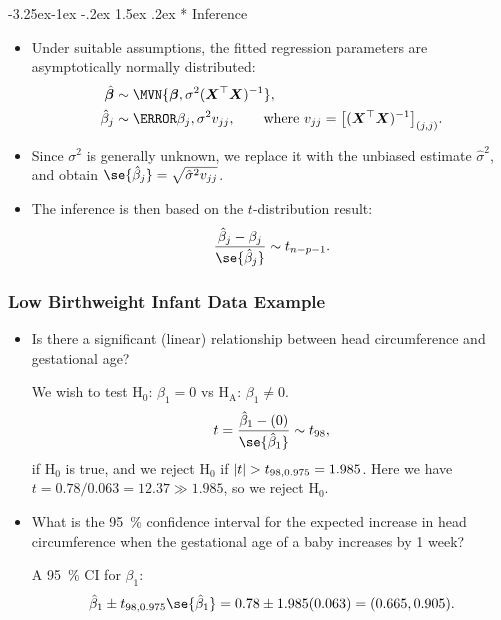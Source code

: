 \documentclass[final]{article}\usepackage[]{graphicx}\usepackage[svgnames]{xcolor}
\makeatletter
\newcommand*\circled[1]{\tikz[baseline=(char.base)]{\node[shape=circle,draw,inner sep=2pt] (char) {#1};}}
\renewcommand\subsection{\@startsection{subsection}{2}{\z@}%
                                     {-3.25ex\@plus -1ex \@minus -.2ex}%
                                     {1.5ex \@plus .2ex}%
                                     {\normalfont\large\bfseries\scshape\color{Blue}}}
\newcommand{\HN}{\text{H}_0}%
\newcommand{\HA}{\text{H}_{\text{A}}}%
\DeclarePairedDelimiter\abs{\lvert}{\rvert}
\providecommand{\Vector}[1]{\bm{#1}}%
\providecommand{\Matrix}[1]{\bm{#1}}
\makeatother
\begin{document}
\subsection*{\circled{4} Inference}
\begin{itemize}
    \item Under suitable assumptions, the fitted regression parameters are asymptotically
          normally distributed:
          \begin{align*}
              \hat{\Vector{\beta}} & \sim \MVN{\Vector{\beta},\sigma^2(\Matrix{X}^\top \Matrix{X})^{-1}},                                              \\
              \hat{\beta}_j        & \sim \N{\beta_j,\sigma^2v_{jj}},\qquad\text{where $v_{jj}=\bigl[(\Matrix{X}^\top\Matrix{X})^{-1}\bigr]_{(j,j)}$}.
          \end{align*}
    \item Since $ \sigma^2 $ is generally unknown, we replace it with the unbiased estimate $ \hat{\sigma}^2 $, and obtain $ \se{\hat{\beta}_j}=\sqrt{\hat{\sigma}^2v_{jj}} $.
    \item The inference is then based on the $t$-distribution result:
          \[ \frac{\hat{\beta}_j-\beta_j}{\se{\hat{\beta}_j}}\sim t_{n-p-1}.  \]
\end{itemize}
\subsubsection*{Low Birthweight Infant Data Example}
\begin{itemize}
    \item Is there a significant (linear) relationship between head circumference and
          gestational age?

          We wish to test $ \HN $: $ \beta_1=0 $ vs $ \HA $: $ \beta_1\ne 0 $.
          \[ t=\frac{\hat{\beta}_1-(0)}{\se{\hat{\beta}_1}}\sim t_{98}, \]
          if $ \HN $ is true, and we reject $ \HN $ if $ \abs{t}>t_{98,0.975}=1.985 $.
          Here we have $ t=0.78/0.063=12.37\gg 1.985 $, so we reject $ \HN $.
    \item What is the \qty{95}{\percent} confidence interval for the expected increase in head
          circumference when the gestational age of a baby increases by 1 week?

          A \qty{95}{\percent} CI for $ \beta_1 $:
          \[ \hat{\beta}_1\pm t_{98,0.975}\se{\hat{\beta}_1}=0.78\pm 1.985(0.063)=(0.665,0.905). \]
\end{itemize}
\end{document}
